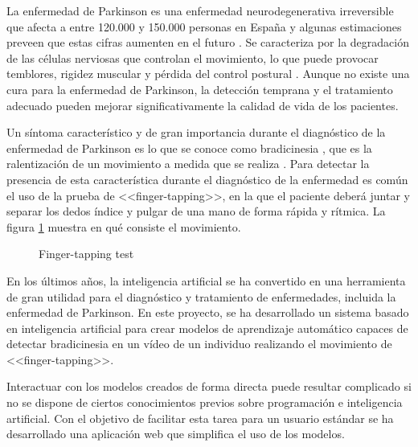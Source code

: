 \label{cha:Introducción}

La enfermedad de Parkinson es una enfermedad neurodegenerativa irreversible que
afecta a entre 120.000 y 150.000 personas en España \cite{santos2021present} y
algunas estimaciones preveen que estas cifras aumenten en el futuro
\cite{sen2021futuro}. Se caracteriza por la degradación de las células nerviosas
que controlan el movimiento, lo que puede provocar temblores, rigidez muscular y
pérdida del control postural \cite{eswiki:148845196}. Aunque no existe una cura
para la enfermedad de Parkinson, la detección temprana y el tratamiento adecuado
pueden mejorar significativamente la calidad de vida de los pacientes.

Un síntoma característico y de gran importancia durante el diagnóstico de la
enfermedad de Parkinson es lo que se conoce como bradicinesia
\cite{postuma2015mds}, que es la ralentización de un movimiento a medida que se
realiza \cite{berardelli2001pathophysiology}. Para detectar la presencia de esta
característica durante el diagnóstico de la enfermedad es común el uso de la
prueba de <<finger-tapping>>, en la que el paciente deberá juntar y separar los
dedos índice y pulgar de una mano de forma rápida y rítmica. La figura
\ref{fig:finger-tapping-test} muestra en qué consiste el movimiento.

\begin{figure}[H]
    \centering
    \caption{Finger-tapping test}
    \label{fig:finger-tapping-test}
\end{figure}

En los últimos años, la inteligencia artificial se ha convertido en una
herramienta de gran utilidad para el diagnóstico y tratamiento de enfermedades,
incluida la enfermedad de Parkinson. En este proyecto, se ha desarrollado un
sistema basado en inteligencia artificial para crear modelos de aprendizaje
automático capaces de detectar bradicinesia en un vídeo de un individuo
realizando el movimiento de <<finger-tapping>>.

Interactuar con los modelos creados de forma directa puede resultar complicado
si no se dispone de ciertos conocimientos previos sobre programación e
inteligencia artificial. Con el objetivo de facilitar esta tarea para un usuario
estándar se ha desarrollado una aplicación web que simplifica el uso de los
modelos.

